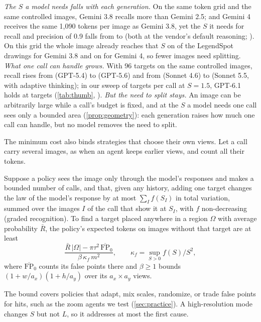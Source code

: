 \emph{The $S$ a model needs falls with each generation.} On the same token grid and the same controlled images, Gemini 3.8 recalls \UtOneHThree{} more than Gemini 2.5; and Gemini 4 receives the same 1{,}090 tokens per image as Gemini 3.8, yet the $S$ it needs for recall and precision of 0.9 falls from \CgenSninetyGemThreeEight{} to \CgenSninetyGemFour{} (both at the vendor's default reasoning; ). On this grid the whole image already reaches that $S$ on \CreachGemThreeEight{} of the \CreachN{} LegendSpot drawings for Gemini 3.8 and on \CreachGemFour{} for Gemini 4, so fewer images need splitting.
\emph{What one call can handle grows.} With 96 targets on the same controlled images, recall rises from \XcapNlastgptFiveFour{} (GPT-5.4) to \XcapNlastgptFiveSix{} (GPT-5.6) and from \XcapNlastsonnetFourSix{} (Sonnet 4.6) to \XcapNlastsonnetFiveFive{} (Sonnet 5.5, with adaptive thinking); in our sweep of targets per call at $S = 1.5$, GPT-6.1 holds at \CgenGptSixOneMax{} targets (\cref{tab:thumb}, ).
\emph{But the need to split stays.} An image can be arbitrarily large while a call's budget is fixed, and at the $S$ a model needs one call sees only a bounded area (\cref{prop:geometry}): each generation raises how much one call can handle, but no model removes the need to split.

The minimum cost also binds strategies that choose their own views. Let a call carry several images, as when an agent keeps earlier views, and count all their tokens.

\begin{proposition}
\label{prop:frontier}
Suppose a policy sees the image only through the model's responses and makes a bounded number of calls, and that, given any history, adding one target changes the law of the model's response by at most $\sum_I f(S_I)$ in total variation, summed over the images $I$ of the call that show it at $S_I$, with $f$ non-decreasing (graded recognition). To find a target placed anywhere in a region $\Omega$ with average probability $\bar R$, the policy's expected tokens on images without that target are at least
\[
\frac{\bar R\,|\Omega| - \pi\tau^2\,\overline{\mathrm{FP}}_0}{\beta\,\kappa_f\, m^2}, \qquad \kappa_f = \sup_{S>0} f(S)/S^2,
\]
where $\overline{\mathrm{FP}}_0$ counts its false points there and $\beta \ge 1$ bounds $(1 + w/a_x)(1 + h/a_y)$ over its $a_x \times a_y$ views.
\end{proposition}

The bound covers policies that adapt, mix scales, randomize, or trade false points for hits, such as the zoom agents we test (\cref{sec:practice}). A high-resolution mode changes $S$ but not $L$, so it addresses at most the first cause.
